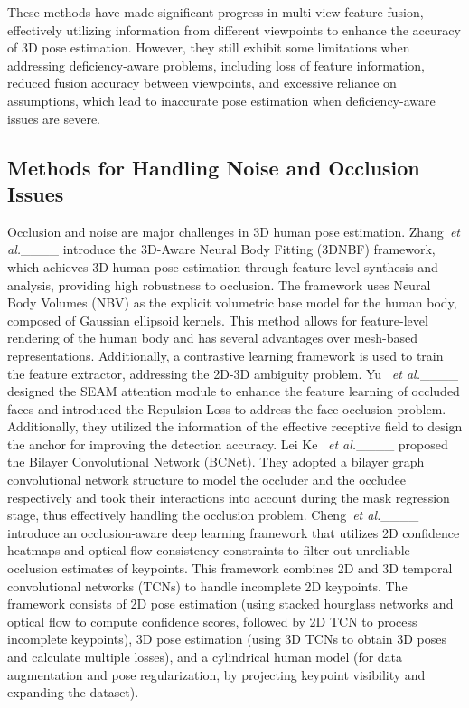 These methods have made significant progress in multi-view feature fusion, effectively utilizing information from different viewpoints to enhance the accuracy of 3D pose estimation. 
However, they still exhibit some limitations when addressing deficiency-aware problems, including loss of feature information, reduced fusion accuracy between viewpoints, and excessive reliance on assumptions, which lead to inaccurate pose estimation when deficiency-aware issues are severe.

\subsection{Methods for Handling Noise and Occlusion Issues}
Occlusion and noise are major challenges in 3D human pose estimation. 
Zhang~\textit{et al.}____ introduce the 3D-Aware Neural Body Fitting (3DNBF) framework, which achieves 3D human pose estimation through feature-level synthesis and analysis, providing high robustness to occlusion. 
The framework uses Neural Body Volumes (NBV) as the explicit volumetric base model for the human body, composed of Gaussian ellipsoid kernels. 
This method allows for feature-level rendering of the human body and has several advantages over mesh-based representations. 
Additionally, a contrastive learning framework is used to train the feature extractor, addressing the 2D-3D ambiguity problem.
Yu ~\textit{et al.}____ designed the SEAM attention module to enhance the feature learning of occluded faces and introduced the Repulsion Loss to address the face occlusion problem. Additionally, they utilized the information of the effective receptive field to design the anchor for improving the detection accuracy.
Lei Ke ~\textit{et al.}____ proposed the Bilayer Convolutional Network (BCNet). 
They adopted a bilayer graph convolutional network structure to model the occluder and the occludee respectively and took their interactions into account during the mask regression stage, thus effectively handling the occlusion problem.
Cheng~\textit{et al.}____ introduce an occlusion-aware deep learning framework that utilizes 2D confidence heatmaps and optical flow consistency constraints to filter out unreliable occlusion estimates of keypoints. 
This framework combines 2D and 3D temporal convolutional networks (TCNs) to handle incomplete 2D keypoints. 
The framework consists of 2D pose estimation (using stacked hourglass networks and optical flow to compute confidence scores, followed by 2D TCN to process incomplete keypoints), 3D pose estimation (using 3D TCNs to obtain 3D poses and calculate multiple losses), and a cylindrical human model (for data augmentation and pose regularization, by projecting keypoint visibility and expanding the dataset). 

